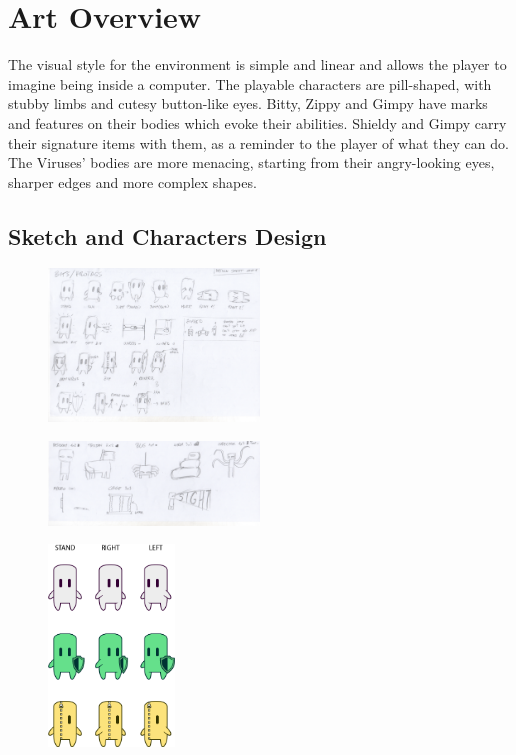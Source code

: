 \documentclass[12pt, a4paper]{report}
\begin{document}
\chapter{Art Overview}
The visual style for the environment is simple and linear and allows the player to imagine being inside a computer.
The playable characters are pill-shaped, with stubby limbs and cutesy button-like eyes. Bitty, Zippy and Gimpy have marks and features on their bodies which evoke their abilities. Shieldy and Gimpy carry their signature items with them, as a reminder to the player of what they can do.\\
The Viruses' bodies are more menacing, starting from their angry-looking eyes, sharper edges and more complex shapes.\\

\section*{Sketch and Characters Design}
\begin{figure}[H]
	\centering
	\includegraphics[width=0.5\textwidth]{images/Characters}
\end{figure}
	\begin{figure}[H]
	\centering
	\includegraphics[width=0.5\textwidth]{images/Enemy}
\end{figure}
	\begin{figure}[H]
	\centering
	\includegraphics[width=0.3\textwidth]{images/Bits}
\end{figure}
\end{document}
